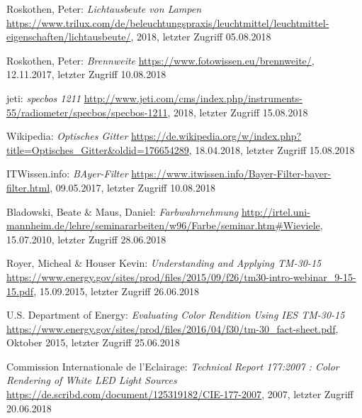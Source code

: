 \begin{thebibliography}{}


Roskothen, Peter:
\emph{\glqq Lichtausbeute von Lampen\grqq}
\url{https://www.trilux.com/de/beleuchtungspraxis/leuchtmittel/leuchtmittel-eigenschaften/lichtausbeute/}, 2018, letzter Zugriff 05.08.2018

Roskothen, Peter:
\emph{\glqq Brennweite\grqq}
\url{https://www.fotowissen.eu/brennweite/}, 12.11.2017, letzter Zugriff 10.08.2018

jeti:
\emph{\glqq specbos 1211\grqq}
\url{http://www.jeti.com/cms/index.php/instruments-55/radiometer/specbos/specbos-1211}, 2018, letzter Zugriff 15.08.2018

Wikipedia:
\emph{\glqq Optisches Gitter\grqq}
\url{https://de.wikipedia.org/w/index.php?title=Optisches_Gitter&oldid=176654289}, 18.04.2018, letzter Zugriff 15.08.2018

ITWissen.info:
\emph{\glqq BAyer-Filter\grqq}
\url{https://www.itwissen.info/Bayer-Filter-bayer-filter.html}, 09.05.2017, letzter Zugriff 10.08.2018

Bladowski, Beate \& Maus, Daniel:
\emph{\glqq Farbwahrnehmung\grqq}
\url{http://irtel.uni-mannheim.de/lehre/seminararbeiten/w96/Farbe/seminar.htm#Wieviele}, 15.07.2010, letzter Zugriff 28.06.2018

Royer, Micheal \& Houser Kevin:
\emph{\glqq Understanding and Applying TM-30-15\grqq}
\url{https://www.energy.gov/sites/prod/files/2015/09/f26/tm30-intro-webinar_9-15-15.pdf}, 15.09.2015, letzter Zugriff 26.06.2018

U.S. Department of Energy:
\emph{\glqq Evaluating Color Rendition Using IES TM-30-15\grqq}
\url{https://www.energy.gov/sites/prod/files/2016/04/f30/tm-30_fact-sheet.pdf}, Oktober 2015, letzter Zugriff 25.06.2018

Commission Internationale de l'Eclairage:
\emph{\glqq Technical Report 177:2007 : Color Rendering of White LED Light Sources\grqq}
\url{https://de.scribd.com/document/125319182/CIE-177-2007}, 2007, letzter Zugriff 20.06.2018


\end{thebibliography}
